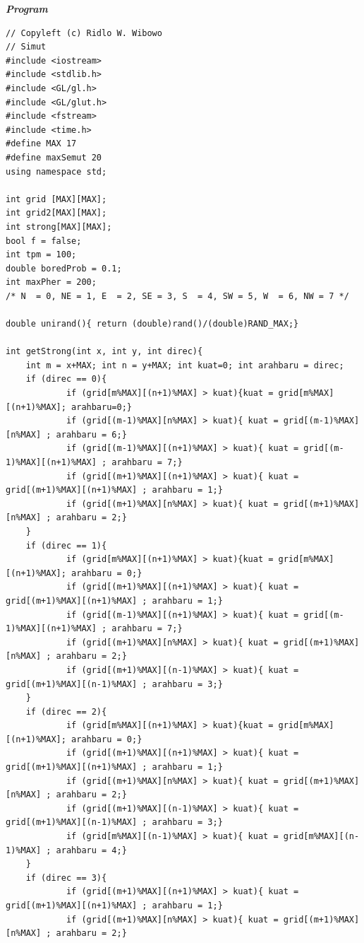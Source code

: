 \documentclass[paper=a4, fontsize=11pt]{scrartcl}
\numberwithin{equation}{section} %
\numberwithin{figure}{section} %
\numberwithin{table}{section} %
\begin{document}
\vspace{1.5cm}
\textit{\textbf{Program}}
\lstset{frameround=fttt}
\begin{lstlisting}
// Copyleft (c) Ridlo W. Wibowo
// Simut
#include <iostream>
#include <stdlib.h>
#include <GL/gl.h>
#include <GL/glut.h>
#include <fstream>
#include <time.h>
#define MAX 17
#define maxSemut 20
using namespace std;

int grid [MAX][MAX];
int grid2[MAX][MAX];
int strong[MAX][MAX];
bool f = false;
int tpm = 100;
double boredProb = 0.1;
int maxPher = 200;
/* N  = 0, NE = 1, E  = 2, SE = 3, S  = 4, SW = 5, W  = 6, NW = 7 */

double unirand(){ return (double)rand()/(double)RAND_MAX;}

int getStrong(int x, int y, int direc){ 
    int m = x+MAX; int n = y+MAX; int kuat=0; int arahbaru = direc;
    if (direc == 0){ 
            if (grid[m%MAX][(n+1)%MAX] > kuat){kuat = grid[m%MAX][(n+1)%MAX]; arahbaru=0;}
            if (grid[(m-1)%MAX][n%MAX] > kuat){ kuat = grid[(m-1)%MAX][n%MAX] ; arahbaru = 6;}
            if (grid[(m-1)%MAX][(n+1)%MAX] > kuat){ kuat = grid[(m-1)%MAX][(n+1)%MAX] ; arahbaru = 7;}
            if (grid[(m+1)%MAX][(n+1)%MAX] > kuat){ kuat = grid[(m+1)%MAX][(n+1)%MAX] ; arahbaru = 1;}
            if (grid[(m+1)%MAX][n%MAX] > kuat){ kuat = grid[(m+1)%MAX][n%MAX] ; arahbaru = 2;}
    }
    if (direc == 1){
            if (grid[m%MAX][(n+1)%MAX] > kuat){kuat = grid[m%MAX][(n+1)%MAX]; arahbaru = 0;}
            if (grid[(m+1)%MAX][(n+1)%MAX] > kuat){ kuat = grid[(m+1)%MAX][(n+1)%MAX] ; arahbaru = 1;}
            if (grid[(m-1)%MAX][(n+1)%MAX] > kuat){ kuat = grid[(m-1)%MAX][(n+1)%MAX] ; arahbaru = 7;}
            if (grid[(m+1)%MAX][n%MAX] > kuat){ kuat = grid[(m+1)%MAX][n%MAX] ; arahbaru = 2;}
            if (grid[(m+1)%MAX][(n-1)%MAX] > kuat){ kuat = grid[(m+1)%MAX][(n-1)%MAX] ; arahbaru = 3;}
    }
    if (direc == 2){
            if (grid[m%MAX][(n+1)%MAX] > kuat){kuat = grid[m%MAX][(n+1)%MAX]; arahbaru = 0;}
            if (grid[(m+1)%MAX][(n+1)%MAX] > kuat){ kuat = grid[(m+1)%MAX][(n+1)%MAX] ; arahbaru = 1;}
            if (grid[(m+1)%MAX][n%MAX] > kuat){ kuat = grid[(m+1)%MAX][n%MAX] ; arahbaru = 2;}
            if (grid[(m+1)%MAX][(n-1)%MAX] > kuat){ kuat = grid[(m+1)%MAX][(n-1)%MAX] ; arahbaru = 3;}
            if (grid[m%MAX][(n-1)%MAX] > kuat){ kuat = grid[m%MAX][(n-1)%MAX] ; arahbaru = 4;}
    }
    if (direc == 3){
            if (grid[(m+1)%MAX][(n+1)%MAX] > kuat){ kuat = grid[(m+1)%MAX][(n+1)%MAX] ; arahbaru = 1;}
            if (grid[(m+1)%MAX][n%MAX] > kuat){ kuat = grid[(m+1)%MAX][n%MAX] ; arahbaru = 2;}

\end{lstlisting}
\end{document}
